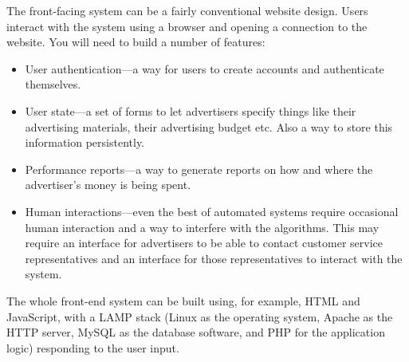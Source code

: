 The front-facing system can be a fairly conventional website design.
Users interact with the system using a browser and opening a 
connection to the website. You will need to build a number of features:
\begin{itemize}
\itemsep 1pt
\item \textrm{User authentication}---a way for users to create accounts and
  authenticate themselves.
\item\textrm{User state}---a set of forms to let advertisers specify things
  like their advertising materials, their advertising budget etc. Also
  a way to store this information persistently.
\item\textrm{Performance reports}---a way to generate reports on how and
  where the advertiser's money is being spent.
\item\textrm{Human interactions}---even the best of automated systems require
  occasional human interaction and a way to interfere with the
  algorithms. This may require an interface for advertisers to be able
  to contact customer service representatives and an interface for
  those representatives to interact with the system.
\end{itemize}
\begin{comment}
There are standard techniques 
for maintaining a list of users, and authenticating them.


Users can enter their ads using text-boxes or file uploads (if
ads can be in image or flash format). They can also enter what
keywords, locales, times-of-day, etc. they want the ads to be shown
in.  The entry can be made more efficient using AJAX, e.g., 
auto-completing keywords, and suggesting synonyms. 

Users also need to specify how much they want to spend in a day,
how much they are willing to pay for an ad to be displayed,
and how much they will pay for an ad that is clicked on.
\end{comment}

The whole front-end system can be built using, for example, HTML and
JavaScript, with a LAMP stack (Linux as the operating system, Apache as the HTTP
server, MySQL as the database software, and PHP for the application logic) 
responding to the user input.

\begin{comment}
In addition to the frontend seen by the users, it would
also be necessary to have a customer service frontend, by which
customer service representatives (CSRs) can over-ride default limits 
on the number of ads or keywords, compute detailed comparisons
of ads, bill customers, etc.

The system also needs to be able to look for 
ads that potentially violate policies on copyright violation or use abusive language.  CSRs can be alerted on ads 
being posted that refer to known copyrights or use words from a dictionary
of potentially unacceptable words.
\end{comment}

